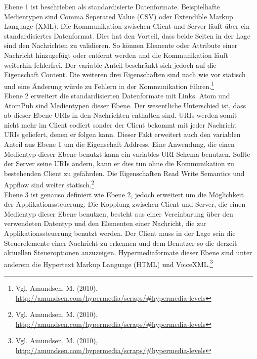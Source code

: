 Ebene 1 ist beschrieben als standardisierte Datenformate. Beispielhafte Medientypen sind Comma Seperated Value (CSV) oder Extendible Markup Language (XML). Die Kommunikation zwischen Client und Server läuft über ein standardisiertes Datenformat. Dies hat den Vorteil, dass beide Seiten in der Lage sind den Nachrichten zu validieren. So können Elemente oder Attribute einer Nachricht hinzugefügt oder entfernt werden und die Kommunikation läuft weiterhin fehlerfrei. Der variable Anteil beschränkt sich jedoch auf die Eigenschaft Content. Die weiteren drei Eigenschaften sind nach wie vor statisch und eine Änderung würde zu Fehlern in der Kommunikation führen.\footnote{Vgl. Amundsen, M. (2010), \url{http://amundsen.com/hypermedia/scraps/#hypermedia-levels}}\\

Ebene 2 erweitert die standardisierten Datenformate mit Links. Atom und AtomPub sind Medientypen dieser Ebene. Der wesentliche Unterschied ist, dass ab dieser Ebene URIs in den Nachrichten enthalten sind. URIs werden somit nicht mehr im Client codiert sonder der Client bekommt mit jeder Nachricht URIs geliefert, denen er folgen kann. Dieser Fakt erweitert auch den variablen Anteil aus Ebene 1 um die Eigenschaft Address. Eine Anwendung, die einen Medientyp dieser Ebene benutzt kann ein variables URI-Schema benutzen. Sollte der Server seine URIs ändern, kann er dies tun ohne die Kommunikation zu bestehenden Client zu gefährden. Die Eigenschaften Read Write Semantics und Appflow sind weiter statisch.\footnote{Vgl. Amundsen, M. (2010), \url{http://amundsen.com/hypermedia/scraps/#hypermedia-levels}}\\

Ebene 3 ist genauso definiert wie Ebene 2, jedoch erweitert um die Möglichkeit der Applikationssteuerung. Die Kopplung zwischen Client und Server, die einen Medientyp dieser Ebene benutzen, besteht aus einer Vereinbarung über den verwendeten Datentyp und den Elementen einer Nachricht, die zur Applikationssteuerung benutzt werden. Der Client muss in der Lage sein die Steuerelemente einer Nachricht zu erkennen und dem Benutzer so die derzeit aktuellen Steueroptionen anzuzeigen. Hypermediaformate dieser Ebene sind unter anderem die Hypertext Markup Language (HTML) und VoiceXML.\footnote{Vgl. Amundsen, M. (2010), \url{http://amundsen.com/hypermedia/scraps/#hypermedia-levels}}\\

